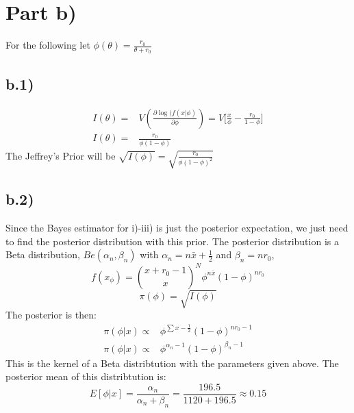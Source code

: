 \documentclass{article}
\begin{document}
\section*{Part b)}
For the following let $ \phi(\theta) = \frac{r_0}{\theta + r_0} $ %
\subsection*{b.1)}

\begin{align*} 
I(\theta) = &  V(\frac{\partial \log(f(x|\phi)}{\partial \phi}) = V \Big[\frac{x}{\phi} - \frac{r_0}{1-\phi} \Big] \\
I(\theta) = & \frac{r_0}{\phi(1-\phi)}
\end{align*}
The Jeffrey's Prior will be $ \sqrt{I(\phi)} = \sqrt{\frac{r_0}{\phi(1-\phi)^2}} $

\subsection*{b.2)} Since the Bayes estimator for i)-iii) is just the posterior expectation, we just need to  find the posterior distribution with this prior. The posterior distribution is a Beta distribution, $ Be(\alpha_n, \beta_n) $ with $\alpha_n = n\bar{x} + \frac{1}{2} $ and $\beta_n = nr_0 $,
$$ f(x_\phi) ={ {x + r_0 - 1 }\choose{x}}^N  \phi^{n \bar{x} } (1-\phi)^{n r_0}  $$
$$ \pi(\phi) = \sqrt{I(\phi)} $$
The posterior is then:
\begin{align*}
\pi(\phi|x) \propto & \phi^{\sum x- \frac{1}{2}} (1 - \phi)^{n r_0 - 1} \\
\pi(\phi|x) \propto &\phi^{\alpha_n - 1}(1 - \phi)^{\beta_n - 1}
\end{align*}
This is the kernel of a Beta distribtution with the parameters given above. 
The posterior mean of this distribtution is:
$$ 
E [\phi|x] = \frac{\alpha_n}{\alpha_n + \beta_n} = \frac{196.5}{1120 + 196.5} \approx 0.15
$$
\end{document}
